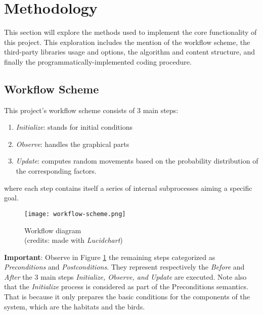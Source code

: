 \section{Methodology}
This section will explore the methods used to implement the core functionality of this project. This exploration includes the mention of the workflow scheme, the third-party libraries usage and options, the algorithm and content structure, and finally the programmatically-implemented coding procedure.

\subsection{Workflow Scheme}
This project's workflow scheme consists of 3 main steps:
\begin{enumerate}
    \item \textit{Initialize}: stands for initial conditions
    \item \textit{Observe}: handles the graphical parts
    \item \textit{Update}: computes random movements based on the probability distribution of the corresponding factors.
\end{enumerate}
where each step contains itself a series of internal subprocesses aiming a specific goal.

\begin{figure}[h!]
    \centering
    \texttt{[image: workflow-scheme.png]}
    \caption{Workflow diagram \\ (credits: made with \emph{Lucidchart})}
    \label{fig:workflow-scheme}
\end{figure}

\noindent
\textbf{Important}: Observe in Figure \ref{fig:workflow-scheme} the remaining steps categorized as \emph{Preconditions} and \emph{Postconditions}. They represent respectively the \emph{Before} and \emph{After} the 3 main steps \emph{Initialize, Observe, and Update} are executed. Note also that the \emph{Initialize} process is considered as part of the Preconditions semantics. That is because it only prepares the basic conditions for the components of the system, which are the habitats and the birds.


